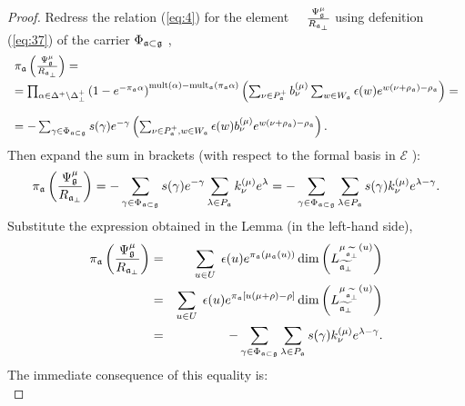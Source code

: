 \documentclass[12pt]{iopart}
\theoremstyle{definition}
\newcommand{\af}{\mathfrak{a}}
\begin{document}
\begin{proof}
Redress the relation (\ref{eq:4}) for the element $\quad
\frac{\Psi _{\frak{g}}^{\mu }}{R_{\af_{\perp }}}$ using defenition (\ref{eq:37})
of the carrier $\Phi _{\af\subset \frak{g}}$ ,
\begin{equation*}
\begin{array}{l}
\pi _{\af}\left( \frac{\Psi _{\frak{g}}^{\mu }}{R_{\af_{\perp }}}%
\right)=\\[2mm]
=\prod_{\alpha \in \Delta ^{+}\setminus \Delta _{\bot
}^{+}}\left( 1-e^{-\pi _{\af}\alpha }\right) ^{\mathrm{mult}(\alpha )-%
\mathrm{mult}_{\af}(\pi _{\af}\alpha )}\left( \sum_{\nu \in P_{%
\af}^{+}}b_{\nu }^{(\mu )}\sum_{w \in W_{\af}}\epsilon
(w )e^{w (\nu +\rho _{\af})-\rho _{\af}}\right) = \\[5mm]
=-\sum_{\gamma \in \Phi _{\af\subset \frak{g}}}s(\gamma )e^{-\gamma
}\left( \sum_{\nu \in P_{\af}^{+},w \in W_{\af}}\epsilon
(w )b_{\nu }^{(\mu )}e^{w (\nu +\rho _{\af})-\rho _{\af%
}}\right).
\end{array}
\end{equation*}
Then expand the sum in brackets (with respect to the formal basis in $\mathcal{E}$%
):
\begin{equation*}
\pi _{\af}\left( \frac{\Psi _{\frak{g}}^{\mu }}{R_{\af_{\perp }}}%
\right) =-\sum_{\gamma \in \Phi _{\af\subset \frak{g}}}s(\gamma
)e^{-\gamma }\sum_{\lambda \in P_{\af}}k_{\nu }^{(\mu )}e^{\lambda
}=-\sum_{\gamma \in \Phi _{\af\subset \frak{g}}}\sum_{\lambda \in P_{%
\af}}s(\gamma )k_{\nu }^{(\mu )}e^{\lambda -\gamma }.
\end{equation*}
Substitute the expression obtained in the Lemma (in the left-hand side),
\begin{eqnarray*}
\pi _{\af}\left( \frac{\Psi _{\frak{g}}^{\mu }}{R_{\af_{\perp }}}%
\right)  &=&\sum_{u\in U}\;\epsilon (u)e^{\pi _{\af}\left( \mu _{\frak{a%
}}\left( u\right) \right) }\dim \left( L_{\widetilde{\af_{\perp }}%
}^{\mu _{\widetilde{\af_{\perp }}}\left( u\right) }\right)
\label{anom modules 2} \\
&=&\sum_{u\in U}\;\epsilon (u)e^{\pi _{\af}\left[ u(\mu +\rho )-\rho %
\right] }\dim \left( L_{\widetilde{\af_{\perp }}}^{\mu _{\widetilde{%
\af_{\perp }}}\left( u\right) }\right)  \\
&=&-\sum_{\gamma \in \Phi _{\af\subset \frak{g}}}\sum_{\lambda \in P_{%
\af}}s(\gamma )k_{\nu }^{(\mu )}e^{\lambda -\gamma }.
\end{eqnarray*}
The immediate consequence of this equality is:
\begin{equation}

\end{equation}
\end{proof}
\end{document}
